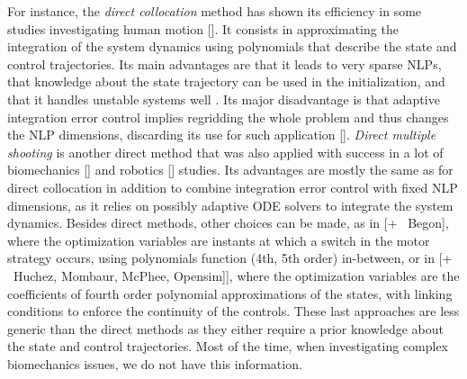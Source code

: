 For instance, the \textit{direct collocation} method has shown its efficiency in some studies investigating human motion [\addref{}]. 
It consists in approximating the integration of the system dynamics using polynomials that describe the state and control trajectories.
Its main advantages are that it leads to very sparse NLPs, that knowledge about the state trajectory can be used in the initialization, and that it handles unstable systems well \cite{diehl2006fast}. 
Its major disadvantage is that adaptive integration error control implies regridding the whole problem and thus changes the NLP dimensions, discarding its use for such application [\addref].
\textit{Direct multiple shooting} is another direct method that was also applied with success in a lot of biomechanics [\addref] and robotics [\addref] studies.
Its advantages are mostly the same as for direct collocation in addition to combine integration error control with fixed NLP dimensions, as it relies on possibly adaptive ODE solvers to integrate the system dynamics.
Besides direct methods, other choices can be made, as in \cite{yeadon2000mechanics} [+ \addref\ Begon], where the optimization variables are instants at which a switch in the motor strategy occurs, using polynomials function (4th, 5th order) in-between, or in \cite{leboeuf2006energetic} [+ \addref\  Huchez, Mombaur, McPhee, Opensim]], where the optimization variables are the coefficients of fourth order polynomial approximations of the states, with linking conditions to enforce the continuity of the controls. 
These last approaches are less generic than the direct methods as they either require a prior knowledge about the state and control trajectories. 
Most of the time, when investigating complex biomechanics issues, we do not have this information. 


